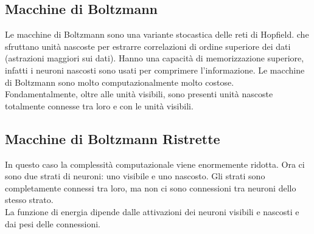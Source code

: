 \subsection{Macchine di Boltzmann}

Le macchine di Boltzmann sono una variante stocastica delle reti di Hopfield.
che sfruttano unità nascoste per estrarre correlazioni di ordine superiore dei
dati (astrazioni maggiori sui dati).
Hanno una capacità di memorizzazione superiore, infatti i neuroni nascosti sono
usati per comprimere l'informazione.
Le macchine di Boltzmann sono molto computazionalmente molto costose.\\
Fondamentalmente, oltre alle unità visibili, sono presenti unità nascoste
totalmente connesse tra loro e con le unità visibili.

\subsection{Macchine di Boltzmann Ristrette}
 
 In questo caso la complessità computazionale viene enormemente ridotta. Ora ci
 sono due strati di neuroni: uno visibile e uno nascosto. Gli strati sono
 completamente connessi tra loro, ma non ci sono connessioni tra neuroni dello
 stesso strato.\\
 La funzione di energia dipende dalle attivazioni dei neuroni visibili e 
 nascosti e dai pesi delle connessioni.

